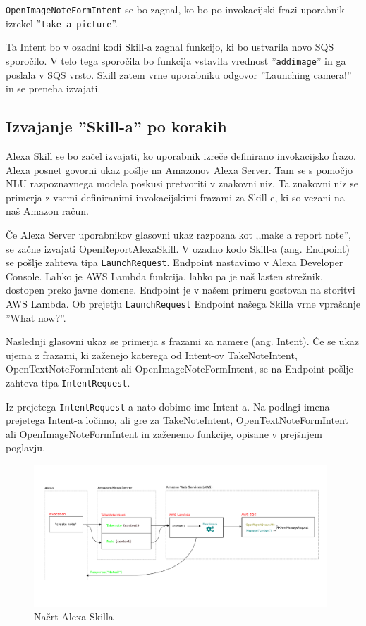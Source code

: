 \documentclass[a4paper, 12pt]{book}
\begin{document}
\texttt{OpenImageNoteFormIntent} se bo zagnal, ko bo po invokacijski frazi uporabnik izrekel ''\texttt{take a picture}''.

Ta Intent bo v ozadni kodi Skill-a zagnal funkcijo, ki bo ustvarila novo SQS sporočilo.
V telo tega sporočila bo funkcija vstavila vrednost ''\texttt{addimage}'' in ga poslala v SQS vrsto.
Skill zatem vrne uporabniku odgovor ''Launching camera!'' in se preneha izvajati.


\subsection{Izvajanje ''Skill-a'' po korakih}

Alexa Skill se bo začel izvajati, ko uporabnik izreče definirano invokacijsko frazo.
Alexa posnet govorni ukaz pošlje na Amazonov Alexa Server.
Tam se s pomočjo NLU razpoznavnega modela poskusi pretvoriti v znakovni niz.
Ta znakovni niz se primerja z vsemi definiranimi invokacijskimi frazami za Skill-e, ki so vezani na naš Amazon račun.

Če Alexa Server uporabnikov glasovni ukaz razpozna kot ,,make a report note'', se začne izvajati OpenReportAlexaSkill.
V ozadno kodo Skill-a (ang. Endpoint) se pošlje zahteva tipa \texttt{LaunchRequest}.
Endpoint nastavimo v Alexa Developer Console.
Lahko je AWS Lambda funkcija, lahko pa je naš lasten strežnik, dostopen preko javne domene.
Endpoint je v našem primeru gostovan na storitvi AWS Lambda.
Ob prejetju \texttt{LaunchRequest} Endpoint našega Skilla vrne vprašanje ''What now?''.


Naslednji glasovni ukaz se primerja s frazami za namere (ang. Intent).
Če se ukaz ujema z frazami, ki zaženejo katerega od Intent-ov TakeNoteIntent, OpenTextNoteFormIntent ali OpenImageNoteFormIntent, se na Endpoint pošlje zahteva tipa \texttt{IntentRequest}.

Iz prejetega \texttt{IntentRequest}-a nato dobimo ime Intent-a.
Na podlagi imena prejetega Intent-a ločimo, ali gre za TakeNoteIntent, OpenTextNoteFormIntent ali OpenImageNoteFormIntent in zaženemo funkcije, opisane v prejšnjem poglavju.


\begin{figure}[H]
\begin{center}
\includegraphics[width=11cm]{skill}
\end{center}
\caption{Načrt Alexa Skilla}
\label{skill}
\end{figure}
\end{document}

